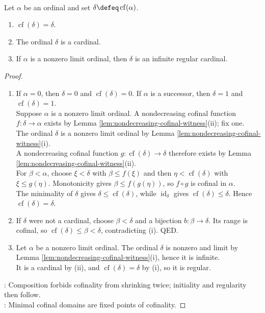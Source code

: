 \begin{theorem} \label{thm:cofinality-is-a-regular-cardinal} \\
Let $\alpha$ be an ordinal and set $\delta\defeq\operatorname{cf}(\alpha)$.
\begin{enumerate}[label=(\roman*)]
\setlength{\itemsep}{0pt}
\item $\operatorname{cf}(\delta)=\delta$.
\item The ordinal $\delta$ is a cardinal.
\item If $\alpha$ is a nonzero limit ordinal, then $\delta$ is an infinite regular cardinal.
\end{enumerate}
\begin{proof}
\begin{enumerate}[label=(\roman*)]
\setlength{\itemsep}{0pt}
\item If $\alpha=0$, then $\delta=0$ and $\operatorname{cf}(\delta)=0$. If $\alpha$ is a successor, then $\delta=1$ and $\operatorname{cf}(\delta)=1$.\\
Suppose $\alpha$ is a nonzero limit ordinal. A nondecreasing cofinal function $f:\delta\to\alpha$ exists by Lemma \ref{lem:nondecreasing-cofinal-witness}(ii); fix one.\\
The ordinal $\delta$ is a nonzero limit ordinal by Lemma \ref{lem:nondecreasing-cofinal-witness}(i).\\
A nondecreasing cofinal function $g:\operatorname{cf}(\delta)\to\delta$ therefore exists by Lemma \ref{lem:nondecreasing-cofinal-witness}(ii).\\
For $\beta<\alpha$, choose $\xi<\delta$ with $\beta\leq f(\xi)$ and then $\eta<\operatorname{cf}(\delta)$ with $\xi\leq g(\eta)$. Monotonicity gives $\beta\leq f(g(\eta))$, so $f\circ g$ is cofinal in $\alpha$.\\
The minimality of $\delta$ gives $\delta\leq\operatorname{cf}(\delta)$, while $\operatorname{id}_{\delta}$ gives $\operatorname{cf}(\delta)\leq\delta$. Hence $\operatorname{cf}(\delta)=\delta$.
\item If $\delta$ were not a cardinal, choose $\beta<\delta$ and a bijection $b:\beta\to\delta$. Its range is cofinal, so $\operatorname{cf}(\delta)\leq\beta<\delta$, contradicting (i). QED.
\item Let $\alpha$ be a nonzero limit ordinal. The ordinal $\delta$ is nonzero and limit by Lemma \ref{lem:nondecreasing-cofinal-witness}(i), hence it is infinite.\\
It is a cardinal by (ii), and $\operatorname{cf}(\delta)=\delta$ by (i), so it is regular.
\end{enumerate}
: Composition forbids cofinality from shrinking twice; initiality and regularity then follow.\\
: Minimal cofinal domains are fixed points of cofinality.
\end{proof}
\end{theorem}

